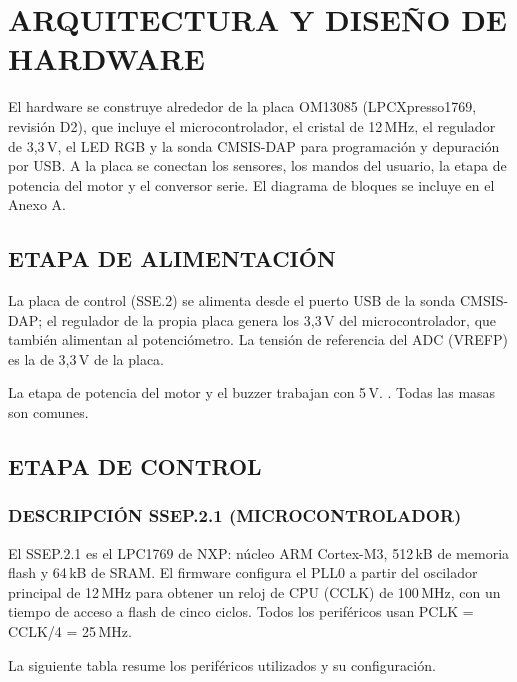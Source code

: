 \section{ARQUITECTURA Y DISEÑO DE HARDWARE}

El hardware se construye alrededor de la placa OM13085 (LPCXpresso1769, revisión D2), que
incluye el microcontrolador, el cristal de 12\,MHz, el regulador de 3,3\,V, el LED RGB y la
sonda CMSIS-DAP para programación y depuración por USB. A la placa se conectan los
sensores, los mandos del usuario, la etapa de potencia del motor y el conversor serie. El
diagrama de bloques se incluye en el Anexo A.

\subsection{ETAPA DE ALIMENTACIÓN}

La placa de control (SSE.2) se alimenta desde el puerto USB de la sonda CMSIS-DAP; el
regulador de la propia placa genera los 3,3\,V del microcontrolador, que también alimentan
al potenciómetro. La tensión de referencia del ADC (VREFP) es la de 3,3\,V de la placa.

La etapa de potencia del motor y el buzzer trabajan con 5\,V.
. Todas las masas son comunes.

\subsection{ETAPA DE CONTROL}

\subsubsection{DESCRIPCIÓN SSEP.2.1 (MICROCONTROLADOR)}

El SSEP.2.1 es el LPC1769 de NXP: núcleo ARM Cortex-M3, 512\,kB de memoria flash y 64\,kB
de SRAM. El firmware configura el PLL0 a partir del oscilador principal de 12\,MHz para
obtener un reloj de CPU (CCLK) de 100\,MHz, con un tiempo de acceso a flash de cinco
ciclos. Todos los periféricos usan PCLK = CCLK/4 = 25\,MHz.

La siguiente tabla resume los periféricos utilizados y su configuración.

